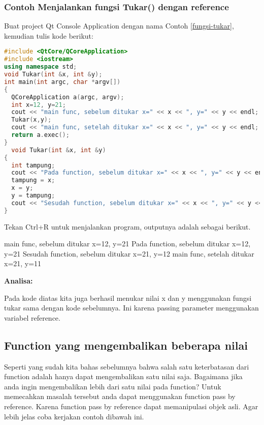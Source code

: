 \subsubsection*{Contoh  Menjalankan fungsi Tukar() dengan reference}

Buat project Qt Console Application dengan nama Contoh \ref{fungsi-tukar}, kemudian
tulis kode berikut:

\begin{lstlisting}[language=c++, caption=Menjalankan fungsi Tukar() dengan reference, label=fungsi-tukar]
#include <QtCore/QCoreApplication>
#include <iostream>
using namespace std;
void Tukar(int &x, int &y);
int main(int argc, char *argv[])
{
  QCoreApplication a(argc, argv);
  int x=12, y=21;
  cout << "main func, sebelum ditukar x=" << x << ", y=" << y << endl;
  Tukar(x,y);
  cout << "main func, setelah ditukar x=" << x << ", y=" << y << endl;
  return a.exec();
}
  void Tukar(int &x, int &y)
{
  int tampung;
  cout << "Pada function, sebelum ditukar x=" << x << ", y=" << y << endl;
  tampung = x;
  x = y;
  y = tampung;
  cout << "Sesudah function, sebelum ditukar x=" << x << ", y=" << y << endl;
}
\end{lstlisting}

Tekan Ctrl+R untuk menjalankan program, outputnya adalah sebagai
berikut.

\begin{lcverbatim}
main func, sebelum ditukar x=12, y=21
Pada function, sebelum ditukar x=12, y=21
Sesudah function, sebelum ditukar x=21, y=12
main func, setelah ditukar x=21, y=11
\end{lcverbatim}

\textbf{Analisa:}

Pada kode diatas kita juga berhasil menukar nilai x dan y menggunakan
fungsi tukar sama dengan kode sebelumnya. Ini karena passing parameter
menggunakan variabel reference.

\subsection{Function yang mengembalikan beberapa
nilai}\label{function-yang-mengembalikan-beberapa-nilai}

Seperti yang sudah kita bahas sebelumnya bahwa salah satu keterbatasan
dari function adalah hanya dapat mengembalikan satu nilai saja.
Bagaimana jika anda ingin mengembalikan lebih dari satu nilai pada
function? Untuk memecahkan masalah tersebut anda dapat menggunakan
function pass by reference. Karena function pass by reference dapat
memanipulasi objek asli. Agar lebih jelas coba kerjakan contoh dibawah
ini.

